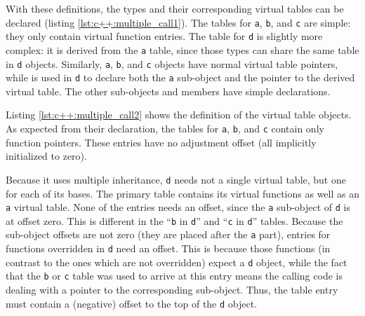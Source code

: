 \begin{figure}[ht]
    
\end{figure}

With these definitions, the types and their corresponding virtual tables can be
declared (listing \ref{lst:c++:multiple_call1}).  The tables for \texttt{a},
\texttt{b}, and \texttt{c} are simple: they only contain virtual function
entries.  The table for \texttt{d} is slightly more complex: it is derived from
the \texttt{a} table, since those types can share the same table in \texttt{d}
objects.  Similarly, \texttt{a}, \texttt{b}, and \texttt{c} objects have normal
virtual table pointers, while  is used in \texttt{d} to
declare both the \texttt{a} sub-object and the pointer to the derived virtual
table.  The other sub-objects and members have simple declarations.

\begin{figure}[ht]
    
\end{figure}

Listing \ref{lst:c++:multiple_call2} shows the definition of the virtual table
objects.  As expected from their declaration, the tables for \texttt{a},
\texttt{b}, and \texttt{c} contain only function pointers.  These entries have
no adjustment offset (all implicitly initialized to zero).

Because it uses multiple inheritance, \texttt{d} needs not a single virtual
table, but one for each of its bases.  The primary table contains its virtual
functions as well as an \texttt{a} virtual table.  None of the entries needs an
offset, since the \texttt{a} sub-object of \texttt{d} is at offset zero.  This
is different in the ``\texttt{b} in \texttt{d}'' and ``\texttt{c} in
\texttt{d}'' tables.  Because the sub-object offsets are not zero (they are
placed after the \texttt{a} part), entries for functions overridden in
\texttt{d} need an offset.  This is because those functions (in contrast to the
ones which are not overridden) expect a \texttt{d} object, while the fact that
the \texttt{b} or \texttt{c} table was used to arrive at this entry means the
calling code is dealing with a pointer to the corresponding sub-object.  Thus,
the table entry must contain a (negative) offset to the top of the \texttt{d}
object.

